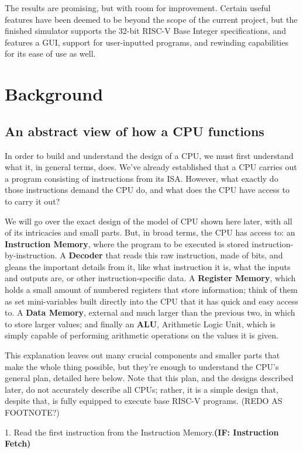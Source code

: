 \documentclass[12pt,twoside]{reedthesis}
\begin{document}
The results are promising, but with room for improvement. Certain useful features have been deemed to be beyond the scope of the current project, but the finished simulator supports the 32-bit RISC-V Base Integer specifications, and features a GUI, support for user-inputted programs, and rewinding capabilities for its ease of use as well.

\chapter{Background}
\section{An abstract view of how a CPU functions}
In order to build and understand the design of a CPU, we must first understand what it, in general terms, does. We've already established that a CPU carries out a program consisting of instructions from its ISA. However, what exactly do those instructions demand the CPU do, and what does the CPU have access to to carry it out?

We will go over the exact design of the model of CPU shown here later, with all of its intricacies and small parts. But, in broad terms, the CPU has access to: an \textbf{Instruction Memory}, where the program to be executed is stored instruction-by-instruction. A \textbf{Decoder} that reads this raw instruction, made of bits, and gleans the important details from it, like what instruction it is, what the inputs and outputs are, or other instruction-specific data. A \textbf{Register Memory}, which holds a small amount of numbered registers that store information; think of them as set mini-variables built directly into the CPU that it has quick and easy access to. A \textbf{Data Memory}, external and much larger than the previous two, in which to store larger values; and finally an \textbf{ALU}, Arithmetic Logic Unit, which is simply capable of performing arithmetic operations on the values it is given.

This explanation leaves out many crucial components and smaller parts that make the whole thing possible, but they're enough to understand the CPU's general plan, detailed here below. Note that this plan, and the designs described later, do not accurately describe all CPUs; rather, it is a simple design that, despite that, is fully equipped to execute base RISC-V programs. (REDO AS FOOTNOTE?)

1. Read the first instruction from the Instruction Memory.\textbf{(IF: Instruction Fetch)}
\end{document}
